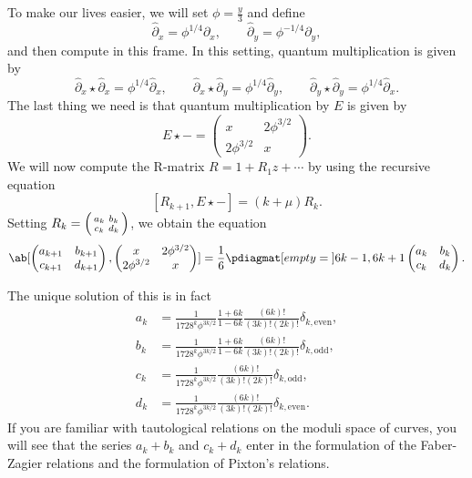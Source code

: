 \documentclass{amsart}
\theoremstyle{definition}
\theoremstyle{remark}
\theoremstyle{plain}
\theoremstyle{definition}
\theoremstyle{remark}
\newcommand{\1}{\mathbf{1}}
\newcommand{\2}{\mathbf{2}}
\newcommand{\3}{\mathbf{3}}
\begin{document}
To make our lives easier, we will set \(\phi = \frac{y}{3}\) and define
\[ \hat{\partial}_x = \phi^{1/4} \partial_x, \qquad \hat{\partial}_y = \phi^{-1/4} \partial_y, \]
and then compute in this frame. In this setting, quantum multiplication is given by
\[ \hat{\partial}_x \star \hat{\partial}_x = \phi^{1/4} \hat{\partial}_x, \qquad \hat{\partial}_x \star \hat{\partial}_y = \phi^{1/4} \hat{\partial}_y, \qquad \hat{\partial}_y \star \hat{\partial}_y = \phi^{1/4} \hat{\partial}_x. \]
The last thing we need is that quantum multiplication by \(E\) is given by
\[ E \star - = \begin{pmatrix}
    x & 2 \phi^{3/2} \\
    2 \phi^{3/2} & x 
\end{pmatrix}. \]
We will now compute the R-matrix \(R = 1 + R_1 z + \cdots\) by using the recursive equation
\[ [R_{k+1}, E \star -] = (k + \mu) R_k. \]
Setting \(R_k = \begin{psmallmatrix}
    a_k & b_k \\
    c_k & d_k
\end{psmallmatrix}\), we obtain the equation
\[ \ab[
    \begin{pmatrix}
        a_{k+1} & b_{k+1} \\
        c_{k+1} & d_{k+1}
    \end{pmatrix}, \begin{pmatrix}
        x & 2 \phi^{3/2} \\
        2 \phi^{3/2} & x 
    \end{pmatrix}
] = \frac{1}{6} \pdiagmat[empty={}]{6k-1, 6k+1} \begin{pmatrix}
    a_k & b_k \\
    c_k & d_k 
\end{pmatrix}. \]

The unique solution of this is in fact
\begin{align*}
    a_k &= \frac{1}{1728^k \phi^{3k/2}} \frac{1+6k}{1-6k} \frac{(6k)!}{(3k)!(2k)!} \delta_{k, \text{even}},  \\
    b_k &= \frac{1}{1728^k \phi^{3k/2}} \frac{1+6k}{1-6k}\frac{(6k)!}{(3k)!(2k)!} \delta_{k, \text{odd}},  \\
    c_k &= \frac{1}{1728^k \phi^{3k/2}}\frac{(6k)!}{(3k)!(2k)!} \delta_{k, \text{odd}}, \\
    d_k &= \frac{1}{1728^k \phi^{3k/2}} \frac{(6k)!}{(3k)!(2k)!} \delta_{k, \text{even}}. 
\end{align*}
If you are familiar with tautological relations on the moduli space of curves, you will see that the series \(a_k + b_k\) and \(c_k + d_k\) enter in the formulation of the Faber-Zagier relations and the formulation of Pixton's relations. 
\end{document}
